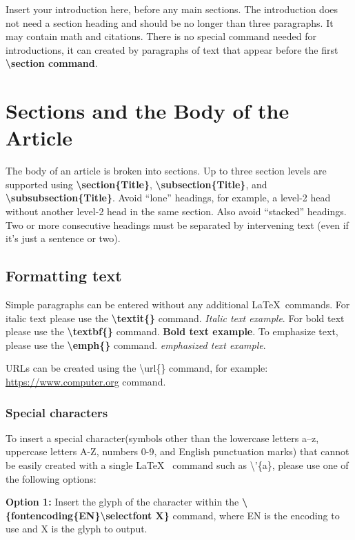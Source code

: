\documentclass[hasAbstract,authorBox]{csmagazine}
\begin{document}
Insert your introduction here, before any main sections. The introduction does not need a section heading and should be no longer than three paragraphs. It may contain math and citations. There is no special command needed for introductions, it can created by paragraphs of text that appear before the first \textbf{\textbackslash{}section command}.

\section{Sections and the Body of the Article}

The body of an article is broken into sections. Up to three section levels are supported using \textbf{\textbackslash{}section\{Title\}}, \textbf{\textbackslash{}subsection\{Title\}}, and \textbf{\textbackslash{}subsubsection\{Title\}}. Avoid ``lone'' headings, for example, a level-2 head without another level-2 head in the same section. Also avoid ``stacked'' headings. Two or more consecutive headings must be separated by intervening text (even if it's just a sentence or two).

\subsection{Formatting text}

Simple paragraphs can be entered without any additional \LaTeX\ commands. For italic text please use the \textbf{\textbackslash{}textit\{\}} command. \textit{Italic text example}. For bold text please use the \textbf{\textbackslash{}textbf\{\}} command. \textbf{Bold text example}. To emphasize text, please use the \textbf{\textbackslash{}emph\{\}} command. \emph{emphasized text example}.

URLs can be created using the \textbackslash{}url\{\} command, for example: \url{https://www.computer.org} command.

\subsubsection{Special characters}

To insert a special character(symbols other than the lowercase letters a–z, uppercase letters A-Z, numbers 0-9, and English punctuation marks) that cannot be easily created with a single \LaTeX~ command such as \textbackslash{}'\{a\}, please use one of the following options:

\textbf{Option 1:} Insert the glyph of the character within the \textbf{\textbackslash{}\{fontencoding\{EN\}\textbackslash{}selectfont X\}} command, where EN is the encoding to use and X is the glyph to output.
\end{document}
